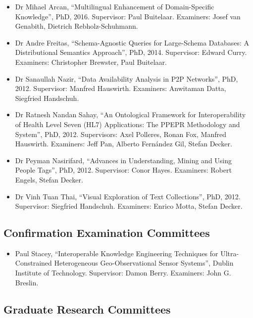 \documentclass[10pt,a4paper]{res} %
\begin{document}
\begin{resume}
\begin{itemize}
\item Dr Mihael Arcan, ``Multilingual Enhancement of Domain-Specific Knowledge'', PhD, 2016. Supervisor: Paul Buitelaar. Examiners: Josef van Genabith, Dietrich Rebholz-Schuhmann.
\item Dr Andre Freitas, ``Schema-Agnostic Queries for Large-Schema Databases: A Distributional Semantics Approach'', PhD, 2014. Supervisor: Edward Curry. Examiners: Christopher Brewster, Paul Buitelaar.
\item Dr Sanaullah Nazir, ``Data Availability Analysis in P2P Networks'', PhD, 2012. Supervisor: Manfred Hauswirth. Examiners: Anwitaman Datta, Siegfried Handschuh.
\item Dr Ratnesh Nandan Sahay, ``An Ontological Framework for Interoperability of Health Level Seven (HL7) Applications: The PPEPR Methodology and System'', PhD, 2012. Supervisors: Axel Polleres, Ronan Fox, Manfred Hauswirth. Examiners: Jeff Pan, Alberto Fern\'{a}ndez Gil, Stefan Decker.
\item Dr Peyman Nasirifard, ``Advances in Understanding, Mining and Using People Tags'', PhD, 2012. Supervisor: Conor Hayes. Examiners: Robert Engels, Stefan Decker.
\item Dr Vinh Tuan Thai, ``Visual Exploration of Text Collections'', PhD, 2012. Supervisor: Siegfried Handschuh. Examiners: Enrico Motta, Stefan Decker.
\end{itemize}

\subsection*{Confirmation Examination Committees}

\begin{itemize} \itemsep -2pt
\item Paul Stacey, ``Interoperable Knowledge Engineering Techniques for Ultra-Constrained Heterogeneous Geo-Observational Sensor Systems'', Dublin Institute of Technology. Supervisor: Damon Berry. Examiners: John G. Breslin.
\end{itemize}

\subsection*{Graduate Research Committees}


\end{resume}
\end{document}
